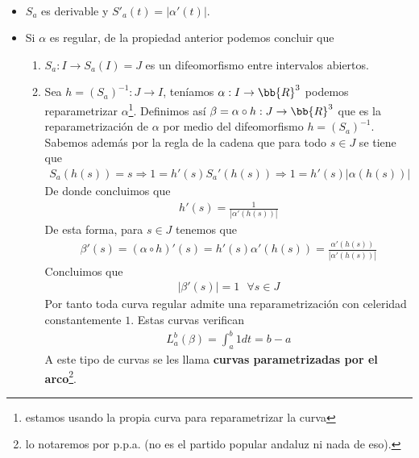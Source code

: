 \begin{propiedades}\
    \begin{itemize}
        \item $S_a$ es derivable y $S'_a(t) = |\alpha'(t)|$.
        \item Si $\alpha$ es regular, de la propiedad anterior podemos concluir que 
        \begin{enumerate}
            \item $S_a: I \to S_a(I)=J$ es un difeomorfismo entre intervalos abiertos.
            \item Sea $h=(S_a)^{-1} : J\to I$, teníamos $\alpha : I \to \bb{R}^3$ podemos reparametrizar $\alpha$\footnote{estamos usando la propia curva para reparametrizar la curva}. Definimos así $\beta = \alpha \circ h : J \to \bb{R}^3$ que es la reparametrización de $\alpha$ por medio del difeomorfismo $h = (S_a)^{-1}$. Sabemos además por la regla de la cadena que para todo $s \in J$ se tiene que
            \begin{gather*}
                S_a(h(s)) = s \Rightarrow 1 = h'(s)S_a'(h(s)) \Rightarrow 1 = h'(s)|\alpha(h(s))|
            \end{gather*}
            De donde concluimos que 
            \begin{gather*}
                h'(s) = \frac{1}{|\alpha'(h(s))|}
            \end{gather*}
            De esta forma, para $s\in J$ tenemos que
            \begin{gather*}
                \beta'(s) = (\alpha \circ h)'(s) = h'(s) \alpha'(h(s)) = \frac{\alpha'(h(s))}{|\alpha'(h(s))|}
            \end{gather*}
            Concluimos que 
            \begin{gather*}
                |\beta'(s)| = 1 \ \ \ \forall s \in J
            \end{gather*}
            Por tanto toda curva regular admite una reparametrización con celeridad constantemente $1$. Estas curvas verifican
            \begin{gather*}
                L_a^b(\beta) =  \int_a^b 1 dt = b-a
            \end{gather*}
            A este tipo de curvas se les llama \textbf{curvas parametrizadas por el arco}\footnote{lo notaremos por p.p.a. (no es el partido popular andaluz ni nada de eso).}.
        \end{enumerate}
    \end{itemize}
\end{propiedades}

